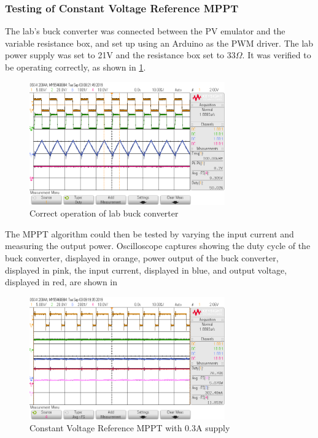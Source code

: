 \documentclass[]{article}
\begin{document}
			\subsubsection{Testing of Constant Voltage Reference MPPT}\label{sssec:CVRMPPT}
				The lab's buck converter was connected between the PV emulator and the variable resistance box, and set up using an Arduino as the PWM driver. The lab power supply was set to 21V and the resistance box set to $33\Omega$. It was verified to be operating correctly, as shown in \cref{fig:lab3buck}.
				\begin{figure}[H]
					\centering
					\includegraphics[width=0.75\textwidth]{Lab3Results/BuckTest_50DutyCycle_100KHz}
					\caption{Correct operation of lab buck converter}
					\label{fig:lab3buck}
				\end{figure}
				The MPPT algorithm could then be tested by varying the input current and measuring the output power. Oscilloscope captures showing the duty cycle of the buck converter, displayed in orange, power output of the buck converter, displayed in pink, the input current, displayed in blue, and output voltage, displayed in red, are shown in 
				\begin{figure}[H]
					\centering
					\includegraphics[width=0.75\textwidth]{Lab3Results/0_30A_Supply}
					\caption{Constant Voltage Reference MPPT with 0.3A supply}
					\label{fig:Lab3_0.3A}
				\end{figure}
\end{document}
